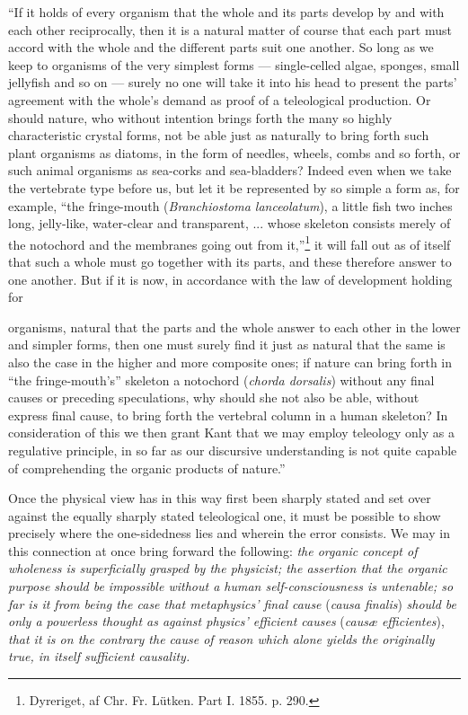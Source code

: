\documentclass[12pt,a4paper]{book}
\begin{document}
``If it holds of every organism that the whole and its parts develop by and with
each other reciprocally, then it is a natural matter of course that each part
must accord with the whole and the different parts suit one another. So long as
we keep to organisms of the very simplest forms --- single-celled algae,
sponges, small jellyfish and so on --- surely no one will take it into his head
to present the parts' agreement with the whole's demand as proof of a
teleological production. Or should nature, who without intention brings forth
the many so highly characteristic crystal forms, not be able just as naturally to
bring forth such plant organisms as diatoms, in the form of needles, wheels,
combs and so forth, or such animal organisms as sea-corks and sea-bladders? Indeed
even when we take the vertebrate type before us, but let it be represented by so
simple a form as, for example, ``the fringe-mouth
(\textit{Branchiostoma lanceolatum}), a little fish two inches long, jelly-like,
water-clear and transparent, ... whose skeleton consists merely of the
notochord and the membranes going out from it,''\footnote{Dyreriget, af Chr. Fr.
Lütken. Part I. 1855. p. 290.} it will fall out as of itself that such a whole
must go together with its parts, and these therefore answer to one another. But
if it is now, in accordance with the law of development holding for

organisms, natural that the parts and the whole answer to each other in the
lower and simpler forms, then one must surely find it just as natural that the
same is also the case in the higher and more composite ones; if nature can bring
forth in ``the fringe-mouth's'' skeleton a notochord
(\textit{chorda dorsalis}) without any final causes or preceding speculations,
why should she not also be able, without express final cause, to bring forth the
vertebral column in a human skeleton? In consideration of this we then grant
Kant that we may employ teleology only as a regulative principle, in so far as
our discursive understanding is not quite capable of comprehending the organic
products of nature.''

Once the physical view has in this way first been sharply stated and set over
against the equally sharply stated teleological one, it must be possible to show
precisely where the one-sidedness lies and wherein the error consists. We may in
this connection at once bring forward the following: \emph{the organic concept
of wholeness is superficially grasped by the physicist; the assertion that the
organic purpose should be impossible without a human self-consciousness is
untenable; so far is it from being the case that metaphysics' final cause}
(\textit{causa finalis}) \emph{should be only a powerless thought as against
physics' efficient causes} (\textit{causæ efficientes}), \emph{that it is on the
contrary the cause of reason which alone yields the originally true, in itself
sufficient causality.}
\end{document}
